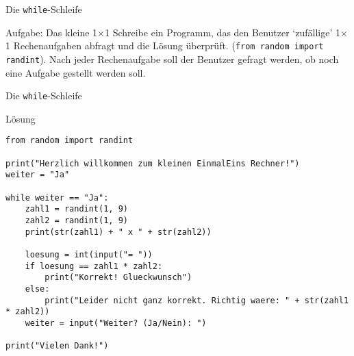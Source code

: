 
\begin{frame}{Die \texttt{while}-Schleife}
\begin{block}{Aufgabe: Das kleine 1$\times$1}
Schreibe ein Programm, das den Benutzer `zufällige' 1$\times$1 Rechenaufgaben abfragt und 
die Lösung überprüft. (\lstinline{from random import randint}). Nach jeder Rechenaufgabe 
soll der Benutzer gefragt werden, ob noch eine Aufgabe gestellt werden soll.
\end{block}
\end{frame}

\begin{frame}[fragile]{Die \texttt{while}-Schleife}
\begin{exampleblock}{Lösung}
\begin{lstlisting}
from random import randint

print("Herzlich willkommen zum kleinen EinmalEins Rechner!")
weiter = "Ja"

while weiter == "Ja":
    zahl1 = randint(1, 9)
    zahl2 = randint(1, 9)
    print(str(zahl1) + " x " + str(zahl2))

    loesung = int(input("= "))
    if loesung == zahl1 * zahl2:
        print("Korrekt! Glueckwunsch")
    else:
        print("Leider nicht ganz korrekt. Richtig waere: " + str(zahl1 * zahl2))
    weiter = input("Weiter? (Ja/Nein): ")

print("Vielen Dank!")
\end{lstlisting}
\end{exampleblock}
\end{frame}


